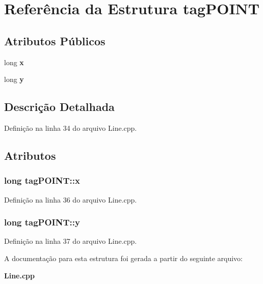 \section{Referência da Estrutura tag\+P\+O\+I\+NT}
\label{structtag_p_o_i_n_t}
\subsection*{Atributos Públicos}
\begin{DoxyCompactItemize}
\item 
long {\bf x}
\item 
long {\bf y}
\end{DoxyCompactItemize}


\subsection{Descrição Detalhada}


Definição na linha 34 do arquivo Line.\+cpp.



\subsection{Atributos}
\subsubsection[{x}]{\setlength{\rightskip}{0pt plus 5cm}long tag\+P\+O\+I\+N\+T\+::x}\label{structtag_p_o_i_n_t_ae507bbc7d7530667f4b30bb13b842f14}


Definição na linha 36 do arquivo Line.\+cpp.

\subsubsection[{y}]{\setlength{\rightskip}{0pt plus 5cm}long tag\+P\+O\+I\+N\+T\+::y}\label{structtag_p_o_i_n_t_a0c39e1480da2b06db8e3c487370fec23}


Definição na linha 37 do arquivo Line.\+cpp.



A documentação para esta estrutura foi gerada a partir do seguinte arquivo\+:\begin{DoxyCompactItemize}
\item 
{\bf Line.\+cpp}\end{DoxyCompactItemize}
